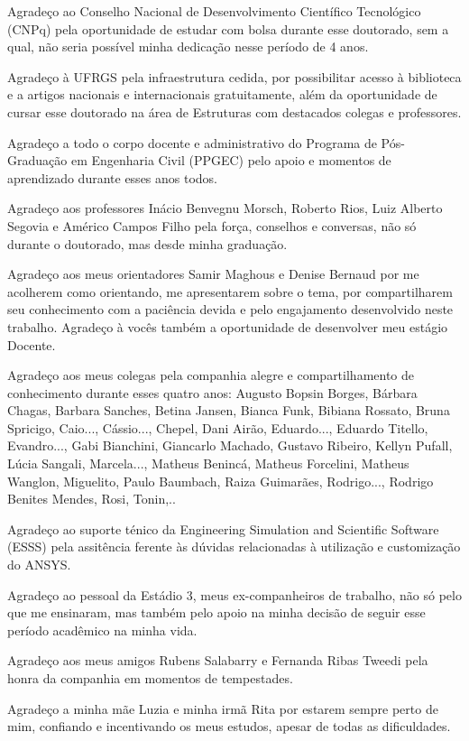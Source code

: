 Agradeço ao Conselho Nacional de Desenvolvimento Científico Tecnológico (CNPq) pela oportunidade de estudar com bolsa durante esse doutorado, sem a qual, não seria possível minha dedicação nesse período de 4 anos.

Agradeço à UFRGS pela infraestrutura cedida, por possibilitar acesso à biblioteca e a artigos nacionais e internacionais gratuitamente, além da oportunidade de cursar esse doutorado na área de Estruturas com destacados colegas e professores.

Agradeço a todo o corpo docente e administrativo do Programa de Pós-Graduação em Engenharia Civil (PPGEC) pelo apoio e momentos de aprendizado durante esses anos todos.

Agradeço aos professores Inácio Benvegnu Morsch, Roberto Rios, Luiz Alberto Segovia e Américo Campos Filho pela força, conselhos e conversas, não só durante o doutorado, mas desde minha graduação.

Agradeço aos meus orientadores Samir Maghous e Denise Bernaud por me acolherem como orientando, me apresentarem sobre o tema, por compartilharem seu conhecimento com a paciência devida e pelo engajamento desenvolvido neste trabalho. Agradeço à vocês também a oportunidade de desenvolver meu estágio Docente.

Agradeço aos meus colegas pela companhia alegre e compartilhamento de conhecimento durante esses quatro anos: Augusto Bopsin Borges, Bárbara Chagas, Barbara Sanches, Betina Jansen, Bianca Funk, Bibiana Rossato, Bruna Spricigo, Caio..., Cássio..., Chepel, Dani Airão, Eduardo..., Eduardo Titello, Evandro..., Gabi Bianchini, Giancarlo Machado, Gustavo Ribeiro, Kellyn Pufall, Lúcia Sangali, Marcela..., Matheus Benincá, Matheus Forcelini, Matheus Wanglon, Miguelito, Paulo Baumbach, Raiza Guimarães, Rodrigo..., Rodrigo Benites Mendes, Rosi, Tonin,..

Agradeço ao suporte ténico da Engineering Simulation and Scientific Software (ESSS) pela assitência ferente às dúvidas relacionadas à utilização e customização do ANSYS.

Agradeço ao pessoal da Estádio 3, meus ex-companheiros de trabalho, não só pelo que me ensinaram, mas também pelo apoio na minha decisão de seguir esse período acadêmico na minha vida.

Agradeço aos meus amigos Rubens Salabarry e Fernanda Ribas Tweedi pela honra da companhia em momentos de tempestades.

Agradeço a minha mãe Luzia e minha irmã Rita por estarem sempre perto de mim, confiando e incentivando os meus estudos, apesar de todas as dificuldades.



